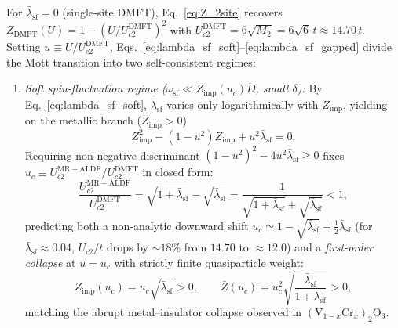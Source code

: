 \documentclass[11pt,a4paper]{article}
\numberwithin{equation}{section}
\theoremstyle{plain}
\theoremstyle{definition}
\begin{document}
For $\bar{\lambda}_{\mathrm{sf}} = 0$ (single-site DMFT), Eq.~\eqref{eq:Z_2site}
recovers $Z_{\mathrm{DMFT}}(U) = 1 - (U/U_{c2}^{\mathrm{DMFT}})^2$ with
$U_{c2}^{\mathrm{DMFT}} = 6\sqrt{M_2} = 6\sqrt{6}\,t \approx 14.70\,t$. Setting
$u \equiv U/U_{c2}^{\mathrm{DMFT}}$, Eqs.~\eqref{eq:lambda_sf_soft}--\eqref{eq:lambda_sf_gapped}
divide the Mott transition into two self-consistent regimes:
\begin{enumerate}
    \item \emph{Soft spin-fluctuation regime ($\omega_{\mathrm{sf}} \ll Z_{\mathrm{imp}}(u_c)D$, small $\delta$):}
    By Eq.~\eqref{eq:lambda_sf_soft}, $\bar{\lambda}_{\mathrm{sf}}$ varies only
    logarithmically with $Z_{\mathrm{imp}}$, yielding on the metallic branch ($Z_{\mathrm{imp}} > 0$)
    \begin{equation}
        Z_{\mathrm{imp}}^2 - (1 - u^2) Z_{\mathrm{imp}} + u^2 \bar{\lambda}_{\mathrm{sf}} = 0.
        \label{eq:Z_quad}
    \end{equation}
    Requiring non-negative discriminant $(1-u^2)^2 - 4u^2\bar{\lambda}_{\mathrm{sf}} \ge 0$
    fixes $u_c \equiv U_{c2}^{\mathrm{MR-ALDF}}/U_{c2}^{\mathrm{DMFT}}$ in closed form:
    \begin{equation}
        \frac{U_{c2}^{\mathrm{MR-ALDF}}}{U_{c2}^{\mathrm{DMFT}}}
        = \sqrt{1 + \bar{\lambda}_{\mathrm{sf}}} - \sqrt{\bar{\lambda}_{\mathrm{sf}}}
        = \frac{1}{\sqrt{1 + \bar{\lambda}_{\mathrm{sf}}} + \sqrt{\bar{\lambda}_{\mathrm{sf}}}}
        < 1,
        \label{eq:Uc_shift}
    \end{equation}
    predicting both a non-analytic downward shift
    $u_c \simeq 1 - \sqrt{\bar{\lambda}_{\mathrm{sf}}} + \frac{1}{2}\bar{\lambda}_{\mathrm{sf}}$
    (for $\bar{\lambda}_{\mathrm{sf}} \approx 0.04$, $U_{c2}/t$ drops by $\sim 18\%$
    from $14.70$ to $\approx 12.0$) and a \emph{first-order collapse} at $u = u_c$ with
    strictly finite quasiparticle weight:
    \begin{equation}
        Z_{\mathrm{imp}}(u_c) = u_c\sqrt{\bar{\lambda}_{\mathrm{sf}}} > 0,
        \qquad
        \bar{Z}(u_c) = u_c^2\sqrt{\frac{\bar{\lambda}_{\mathrm{sf}}}{1 + \bar{\lambda}_{\mathrm{sf}}}} > 0,
        \label{eq:Z_jump}
    \end{equation}
    matching the abrupt metal--insulator collapse observed in $(\mathrm{V}_{1-x}\mathrm{Cr}_x)_2\mathrm{O}_3$.


\end{enumerate}
\end{document}
